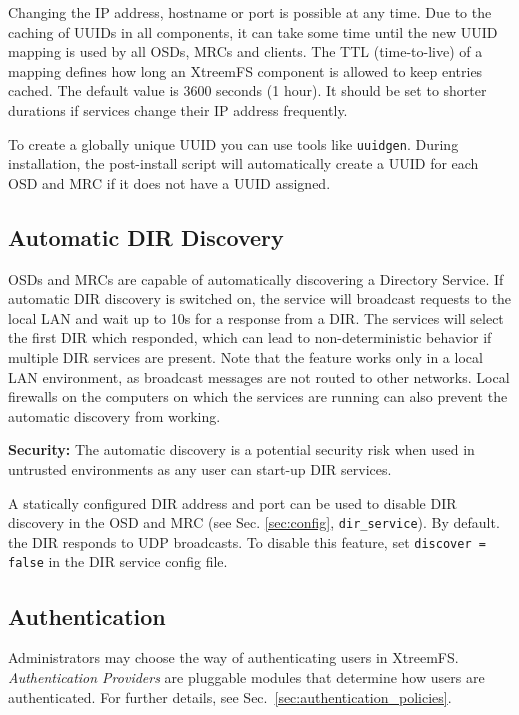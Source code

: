 \documentclass[a4paper,10pt]{book}
\begin{document}
Changing the IP address, hostname or port is possible at any time. Due to the caching of UUIDs in all components, it can take some time until the new UUID mapping is used by all OSDs, MRCs and clients. The TTL (time-to-live) of a mapping defines how long an XtreemFS component is allowed to keep entries cached. The default value is 3600 seconds (1 hour). It should be set to shorter durations if services change their IP address frequently.

To create a globally unique UUID you can use tools like \texttt{uuidgen}. During installation, the post-install script will automatically create a UUID for each OSD and MRC if it does not have a UUID assigned.

\subsection{Automatic DIR Discovery}
\label{sec:autodiscover}
OSDs and MRCs are capable of automatically discovering a Directory Service. If automatic DIR discovery is switched on, the service will broadcast requests to the local LAN and wait up to 10s for a response from a DIR. The services will select the first DIR which responded, which can lead to non-deterministic behavior if multiple DIR services are present. Note that the feature works only in a local LAN environment, as broadcast messages are not routed to other networks. Local firewalls on the computers on which the services are running can also prevent the automatic discovery from working.

\textbf{Security:} The automatic discovery is a potential security risk when used in untrusted environments as any user can start-up DIR services.

A statically configured DIR address and port can be used to disable DIR discovery in the OSD and MRC (see Sec. \ref{sec:config}, \texttt{dir\_service}). By default. the DIR responds to UDP broadcasts. To disable this feature, set  \texttt{discover = false} in the DIR service config file.


\subsection{Authentication}
\label{sec:AuthProvider}
Administrators may choose the way of authenticating users in XtreemFS. \emph{Authentication Providers} are pluggable modules that determine how users are authenticated. For further details, see Sec.\ \ref{sec:authentication_policies}.
\end{document}
